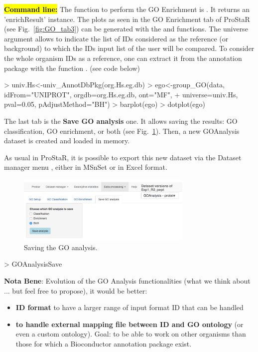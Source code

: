 \documentclass[12pt]{article}
\begin{document}
{\hl{\bf Command line:} The  function to perform the GO 
Enrichment is . It returns an 'enrichResult' instance.
The plots as seen in the GO Enrichment tab of ProStaR 
(see Fig.~\ref{fig:GO_tab3}) can be generated with the  and
 functions. 
The universe argument allows to indicate the list of IDs considered as the 
reference (or background) to which the IDs input list of the user will be 
compared. 
To consider the whole organism IDs as a reference, one can extract it from 
the annotation package with the  function 
. (see code below)


\begin{Schunk}
\begin{Sinput}
> univ.Hs<-univ_AnnotDbPkg(org.Hs.eg.db)
> ego<-group_GO(data, idFrom="UNIPROT", orgdb=org.Hs.eg.db, ont="MF", 
+               universe=univ.Hs, pval=0.05, pAdjustMethod="BH")
> barplot(ego)
> dotplot(ego)
\end{Sinput}
\end{Schunk}


The last tab is the \textbf{Save GO analysis} one. It allows saving the results:
GO classification, GO enrichment, or both (see Fig.~\ref{fig:GO_tab4}).
Then, a new GOAnalysis dataset is created and loaded in memory. 

As usual in ProStaR, it is possible to export this new dataset via the Dataset
manager menu , either in MSnSet or in Excel format. 

\begin {figure}
\centering
\includegraphics[width=0.75\textwidth]{images/GO_tab4.png}
\caption{Saving the GO analysis.}\label{fig:GO_tab4}
\end {figure}

\begin{Schunk}
\begin{Sinput}
> GOAnalysisSave
\end{Sinput}
\end{Schunk}


\textbf{Nota Bene}: Evolution of the GO Analysis functionalities (what we think 
about ... but feel free to propose), it would be better:
\begin{itemize}
\item \textbf{ID format} to have a larger range of input 
format ID that can be handled
\item \textbf{to handle external mapping file between ID and GO ontology} 
(or even a custom ontology). Goal: to be able to work on other organisms than 
those for which a Bioconductor annotation package exist. 
\end{itemize}



}
\end{document}

